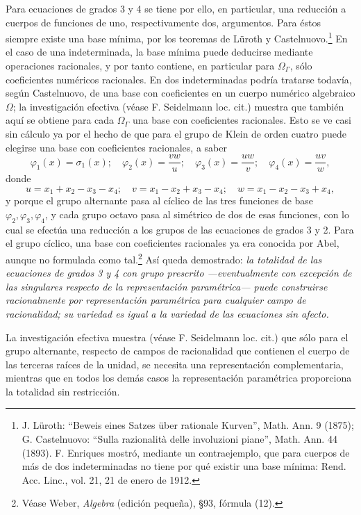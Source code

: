 \documentclass[11pt]{article}
\begin{document}
Para ecuaciones de grados 3 y 4 se tiene por ello, en particular, una reducción a cuerpos de funciones de uno, respectivamente dos, argumentos. Para éstos siempre existe una base mínima, por los teoremas de Lüroth y Castelnuovo.\footnote{J. Lüroth: ``Beweis eines Satzes über rationale Kurven'', Math. Ann. 9 (1875); G. Castelnuovo: ``Sulla razionalità delle involuzioni piane'', Math. Ann. 44 (1893). F. Enriques mostró, mediante un contraejemplo, que para cuerpos de más de dos indeterminadas no tiene por qué existir una base mínima: Rend. Acc. Linc., vol. 21, 21 de enero de 1912.} En el caso de una indeterminada, la base mínima puede deducirse mediante operaciones racionales, y por tanto contiene, en particular para $\Omega_\Gamma$, sólo coeficientes numéricos racionales. En dos indeterminadas podría tratarse todavía, según Castelnuovo, de una base con coeficientes en un cuerpo numérico algebraico $\Omega$; la investigación efectiva (véase F. Seidelmann loc. cit.) muestra que también aquí se obtiene para cada $\Omega_\Gamma$ una base con coeficientes racionales. Esto se ve casi sin cálculo ya por el hecho de que para el grupo de Klein de orden cuatro puede elegirse una base con coeficientes racionales, a saber
\[
\varphi_1(x)=\sigma_1(x);\quad
\varphi_2(x)=\frac{vw}{u};\quad
\varphi_3(x)=\frac{uw}{v};\quad
\varphi_4(x)=\frac{uv}{w},
\]
donde
\[
u=x_1+x_2-x_3-x_4;\quad v=x_1-x_2+x_3-x_4;\quad w=x_1-x_2-x_3+x_4,
\]
y porque el grupo alternante pasa al cíclico de las tres funciones de base $\varphi_2,\varphi_3,\varphi_4$, y cada grupo octavo pasa al simétrico de dos de esas funciones, con lo cual se efectúa una reducción a los grupos de las ecuaciones de grados 3 y 2. Para el grupo cíclico, una base con coeficientes racionales ya era conocida por Abel, aunque no formulada como tal.\footnote{Véase Weber, \emph{Algebra} (edición pequeña), \S 93, fórmula (12).} Así queda demostrado: \emph{la totalidad de las ecuaciones de grados 3 y 4 con grupo prescrito ---eventualmente con excepción de las singulares respecto de la representación paramétrica--- puede construirse racionalmente por representación paramétrica para cualquier campo de racionalidad; su variedad es igual a la variedad de las ecuaciones sin afecto.}

La investigación efectiva muestra (véase F. Seidelmann loc. cit.) que sólo para el grupo alternante, respecto de campos de racionalidad que contienen el cuerpo de las terceras raíces de la unidad, se necesita una representación complementaria, mientras que en todos los demás casos la representación paramétrica proporciona la totalidad sin restricción.
\end{document}
